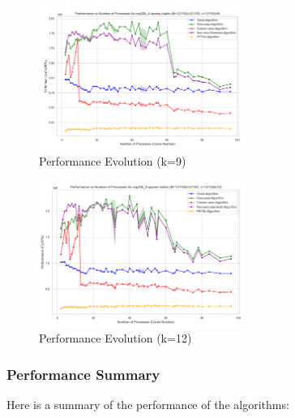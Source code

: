 \documentclass[12pt,oneside]{book} %
\begin{document}
\begin{figure}[H]
    \centering
    \includegraphics[width=0.6\textwidth]{../results/fat_vector_dim/cop20k_A_k9_performance.png}
    \caption{Performance Evolution (k=9)}\label{fig:cop20k-a-k9-performance}
\end{figure}

\begin{figure}[H]
    \centering
    \includegraphics[width=0.6\textwidth]{../results/fat_vector_dim/cop20k_A_k12_performance.png}
    \caption{Performance Evolution (k=12)}\label{fig:cop20k-a-k12-performance}
\end{figure}

\subsubsection{Performance Summary}

Here is a summary of the performance of the algorithms:
\end{document}
